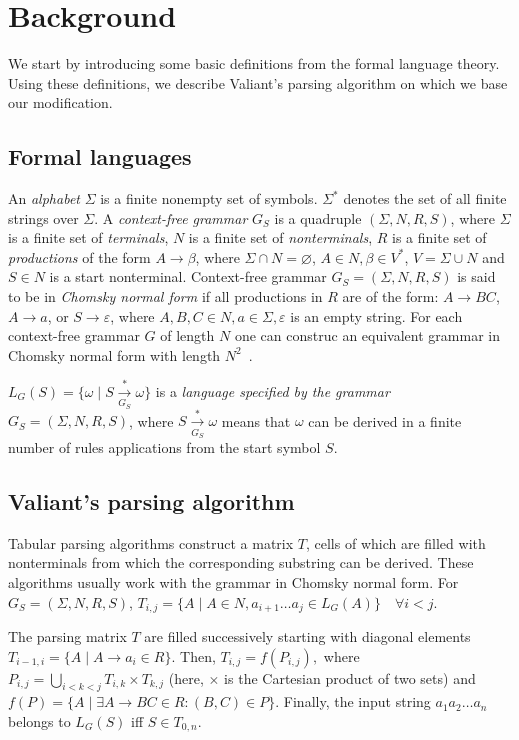 \section{Background}

We start by introducing some basic definitions from the formal language theory. Using these definitions, we describe Valiant's parsing algorithm on which we base our modification. 

\subsection{Formal languages}

An \emph{alphabet} $\Sigma$ is a finite nonempty set of symbols.
$\Sigma^{*}$ denotes the set of all finite strings over $\Sigma$.
A \emph{context-free grammar} $G_S$ is a quadruple $(\Sigma, N, R, S)$, where $\Sigma$ is a finite set of \emph{terminals}, $N$ is a finite set of \emph{nonterminals}, $R$ is a finite set of \emph{productions} of the form $A \rightarrow \beta$, where $\Sigma \cap N = \varnothing$, $A \in N, \beta \in V^{*}$, $V = \Sigma \cup N$ and $S \in N$ is a start nonterminal.
Context-free grammar $G_S = (\Sigma, N, R, S)$ is said to be in \emph{Chomsky normal form} if all productions in $R$ are of the form: $A \rightarrow BC$, $A \rightarrow a$, or $S \rightarrow \varepsilon$, where $A, B, C \in N, a \in \Sigma, \varepsilon$ is an empty string.
For each context-free grammar $G$ of length $N$ one can construc an equivalent grammar in Chomsky normal form with length $N^2$~\cite{hopcroft2008introduction}.

$L_{G}(S) = \{ \omega \mid S\xrightarrow[G_S]{*} \omega\}$ is a \emph{language specified by the grammar} $G_{S} = (\Sigma, N, R, S)$, where $S \xrightarrow[G_S]{*} \omega$ means that $\omega$ can be derived in a finite number of rules applications from the start symbol $S$.

\subsection{Valiant's parsing algorithm}

Tabular parsing algorithms construct a matrix $T$, cells of which are filled with nonterminals from which the corresponding substring can be derived. 
These algorithms usually work with the grammar in Chomsky normal form.
For $G_S=(\Sigma, N, R, S)$, $T_{i, j} =  \{ A \mid A \in N, a_{i + 1} \dots a_{j} \in L_{G}(A)\} \quad \forall i < j$.

The parsing matrix $T$ are filled successively starting with diagonal elements $T_{i - 1, i} = \{ A \mid A \rightarrow a_{i} \in R\}.$
Then, $T_{i, j} = f(P_{i, j}),$ where
$P_{i, j} = \bigcup\limits_{i < k < j} T_{i,k} \times T_{k, j}$ (here, $\times$ is the Cartesian product of two sets) and
$f(P) = \{A \mid \exists A \rightarrow BC \in R : (B, C) \in P\}.$
Finally, the input string $a_{1}a_{2} \dots a_{n}$ belongs to $L_{G}(S)$ iff $S \in T_{0, n}$.

